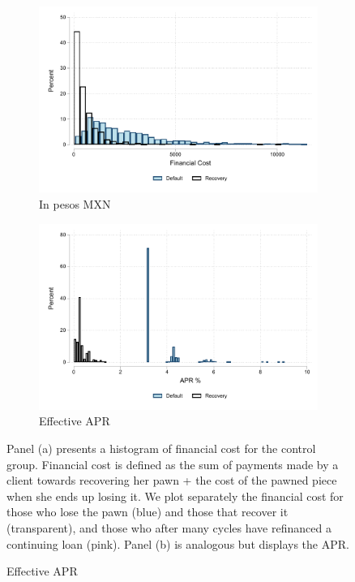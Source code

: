 \documentclass[oneside,11pt]{article}
\begin{document}
\vspace{.2in}
\begin{figure}[H]
     \caption{Financial cost}
    \label{fc_hist}
    \begin{center}
    \begin{subfigure}{.45\textwidth}
      \caption{In pesos MXN}
        \centering
        \includegraphics[width=\textwidth]{Figuras/hist_fc.pdf}
    \end{subfigure}
     \begin{subfigure}{0.45\textwidth}
    \caption{Effective APR}
       \centering
      \includegraphics[width=\textwidth]{Figuras/hist_apr.pdf}
    \end{subfigure}
    \end{center}
         \scriptsize
         Panel (a) presents a histogram of financial cost for the control group. Financial cost is defined as the sum of payments made by a client towards recovering her pawn + the cost of the pawned piece when she ends up losing it. We plot separately the financial cost for those who lose the pawn (blue) and those that recover it (transparent), and those who after many cycles have refinanced a continuing loan (pink).  Panel (b) is analogous but displays the APR.  %
       
\end{figure}
\end{document}
